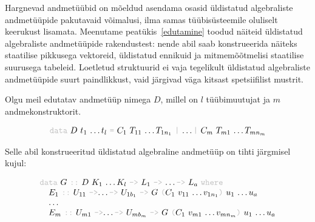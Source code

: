 \documentclass[12pt]{article}
\begin{document}
        Hargnevad andmetüübid on mõeldud asendama osasid üldistatud algebraliste andmetüüpide pakutavaid võimalusi, ilma samas tüübisüsteemile oluliselt keerukust lisamata. Meenutame peatükis~\ref{edutamine} toodud näiteid üldistatud algebraliste andmetüüpide rakendustest: nende abil saab konstrueerida näiteks staatilise pikkusega vektoreid, üldistatud ennikuid ja mitmemõõtmelisi staatilise suurusega tabeleid. Loetletud struktuurid ei vaja tegelikult üldistatud algebraliste andmetüüpide suurt paindlikkust, vaid järgivad väga kitsast spetsiifilist mustrit.

        Olgu meil edutatav andmetüüp nimega $D$, millel on $l$ tüübimuutujat ja $m$ andmekonstruktorit.

        \begin{equation*}
          \begin{tabular}{l}
            {\color{helehall}\verb!data!} $D$ $t_1$ \ldots $t_l$ {\color{helehall}\verb!=!} $C_1$ $T_{11}$ \ldots $T_{1n_1}$ {\color{helehall}\verb!|!} \ldots {\color{helehall}\verb!|!} $C_m$ $T_{m1}$ \ldots $T_{mn_m}$
          \end{tabular}
        \end{equation*}

        Selle abil konstrueeritud üldistatud algebraline andmetüüp on tihti järgmisel kujul:

        \begin{equation*}
          \begin{tabular}{l}
            {\color{helehall}\verb!data!} $G$ {\color{helehall}\verb!::!} $D$ $K_1$ \ldots $K_l$ {\color{helehall}\verb!->!} $L_1$ {\color{helehall}\verb!->!} \ldots {\color{helehall}\verb!->!} $L_a$ {\color{helehall}\verb!where!} \\
            \verb!  !$E_1$ {\color{helehall}\verb!::!} $U_{11}$ {\color{helehall}\verb!->!}\ldots {\color{helehall}\verb!->!} $U_{1b_1}$ {\color{helehall}\verb!->!} $G$ {\color{helehall}\verb!(!}$C_1$ $v_{11}$ \ldots $v_{1n_1}${\color{helehall}\verb!)!} $u_1$ \ldots $u_a$ \\
            \verb!  !\ldots \\
            \verb!  !$E_m$ {\color{helehall}\verb!::!} $U_{m1}$ {\color{helehall}\verb!->!}\ldots {\color{helehall}\verb!->!} $U_{mb_m}$ {\color{helehall}\verb!->!} $G$ {\color{helehall}\verb!(!}$C_1$ $v_{m1}$ \ldots $v_{mn_m}${\color{helehall}\verb!)!} $u_1$ \ldots $u_a$
          \end{tabular}
        \end{equation*}
\end{document}

